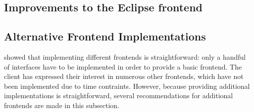 

\subsection{Improvements to the Eclipse frontend}
\label{ssec:impr-eclipse}



\subsection{Alternative Frontend Implementations}
\label{ssec:discuss-alternative-frontend}

 showed that implementing different frontends is
straightforward: only a handful of interfaces have to be implemented in order to
provide a basic frontend. The client has expressed their interest in numerous
other frontends, which have not been implemented due to time contraints.
However, because providing additional implementations is straightforward,
several recommendations for additional frontends are made in this subsection.





